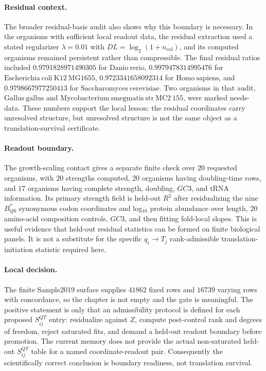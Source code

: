 \paragraph{Residual context.}
The broader residual-basis audit also shows why this boundary is necessary. In the organisms with sufficient local readout data, the residual extraction used a stated regularizer $\lambda=0.01$ with $DL=\log_2(1+n_{\mathrm{col}})$, and its computed organisms remained persistent rather than compressible. The final residual ratios included $0.9791828971490305$ for $\mathrm{Danio\ rerio}$, $0.9979478314995476$ for $\mathrm{Escherichia\ coli\ K12\ MG1655}$, $0.9723341658092314$ for $\mathrm{Homo\ sapiens}$, and $0.9798667977250413$ for $\mathrm{Saccharomyces\ cerevisiae}$. Two organisms in that audit, $\mathrm{Gallus\ gallus}$ and $\mathrm{Mycobacterium\ smegmatis\ str\ MC2\ 155}$, were marked needs-data. These numbers support the local lesson: the residual coordinates carry unresolved structure, but unresolved structure is not the same object as a translation-survival certificate.

\paragraph{Readout boundary.}
The growth-scaling contact gives a separate finite check over $20$ requested organisms, with $20$ strengths computed, $20$ organisms having doubling-time rows, and $17$ organisms having complete strength, doubling, $GC3$, and tRNA information. Its primary strength field is held-out $R^2$ after residualizing the nine $B^{*}_{Q6}$ synonymous codon coordinates and log$_{10}$ protein abundance over length, $20$ amino-acid composition controls, $GC3$, and then fitting fold-local slopes. This is useful evidence that held-out residual statistics can be formed on finite biological panels. It is not a substitute for the specific $q_i\to T_j$ rank-admissible translation-initiation statistic required here.

\paragraph{Local decision.}
The finite Sample2019 surface supplies $41862$ fixed rows and $16739$ varying rows with concordance, so the chapter is not empty and the gate is meaningful. The positive statement is only that an admissibility protocol is defined for each proposed $S^{QT}_{ij}$ entry: residualize against $Z$, compute post-control rank and degrees of freedom, reject saturated fits, and demand a held-out readout boundary before promotion. The current memory does not provide the actual non-saturated held-out $S^{QT}_{ij}$ table for a named coordinate-readout pair. Consequently the scientifically correct conclusion is boundary readiness, not translation survival.

